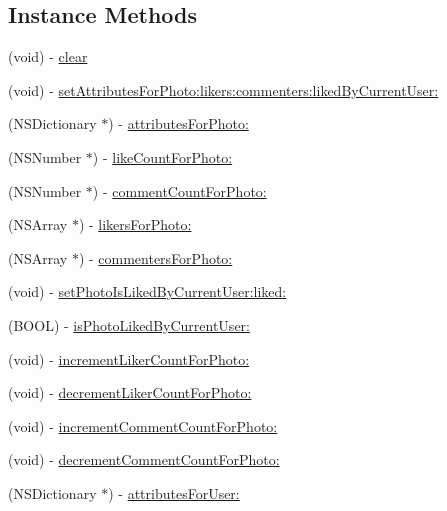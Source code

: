 \subsection*{Instance Methods}
\begin{DoxyCompactItemize}
\item 
(void) -\/ \hyperlink{interface_e_s_cache_acc5d2a11a8849b19f2a0b09c8db5ae43}{clear}
\item 
(void) -\/ \hyperlink{interface_e_s_cache_aedeac7dcf9ab638c4d1ed0ebdc364dbf}{set\+Attributes\+For\+Photo\+:likers\+:commenters\+:liked\+By\+Current\+User\+:}
\item 
(N\+S\+Dictionary $\ast$) -\/ \hyperlink{interface_e_s_cache_adeb147e73d8c5f042fc8aff44b909119}{attributes\+For\+Photo\+:}
\item 
(N\+S\+Number $\ast$) -\/ \hyperlink{interface_e_s_cache_a884075d68dfce4d6a1dd86616c8f8af9}{like\+Count\+For\+Photo\+:}
\item 
(N\+S\+Number $\ast$) -\/ \hyperlink{interface_e_s_cache_adee030a3e423def2e12dacfc07791346}{comment\+Count\+For\+Photo\+:}
\item 
(N\+S\+Array $\ast$) -\/ \hyperlink{interface_e_s_cache_a32d9bbbdcd77cc2cd9be0b30e047e094}{likers\+For\+Photo\+:}
\item 
(N\+S\+Array $\ast$) -\/ \hyperlink{interface_e_s_cache_a4d2346185ff5a25ef5603ff46258af30}{commenters\+For\+Photo\+:}
\item 
(void) -\/ \hyperlink{interface_e_s_cache_a36e754c16df687f35aa68fa3428507b9}{set\+Photo\+Is\+Liked\+By\+Current\+User\+:liked\+:}
\item 
(B\+O\+O\+L) -\/ \hyperlink{interface_e_s_cache_a5cd7cdbc0d866fc04b428ea1f4217833}{is\+Photo\+Liked\+By\+Current\+User\+:}
\item 
(void) -\/ \hyperlink{interface_e_s_cache_a737b99e5339a929b4d7c91d559abdb33}{increment\+Liker\+Count\+For\+Photo\+:}
\item 
(void) -\/ \hyperlink{interface_e_s_cache_a5dc045b1e6ae70bc26ea5a397f387dd2}{decrement\+Liker\+Count\+For\+Photo\+:}
\item 
(void) -\/ \hyperlink{interface_e_s_cache_ae83682d1599a6c050257fb1a2fda5748}{increment\+Comment\+Count\+For\+Photo\+:}
\item 
(void) -\/ \hyperlink{interface_e_s_cache_a96a9d46a75eb3e7a8953f69c38b587e3}{decrement\+Comment\+Count\+For\+Photo\+:}
\item 
(N\+S\+Dictionary $\ast$) -\/ \hyperlink{interface_e_s_cache_a65e2ffdce06c4785ef53d806388012c6}{attributes\+For\+User\+:}

\end{DoxyCompactItemize}
